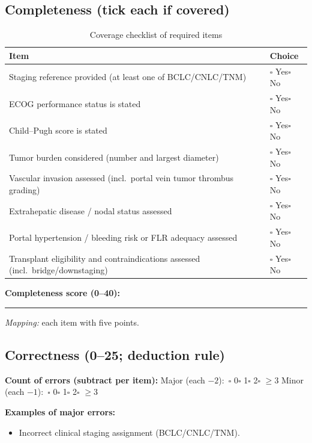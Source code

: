 \documentclass{article}
\begin{document}
\begin{appendices}
\subsection{Completeness (tick each if covered)}
\addtocounter{table}{-1}
\begin{table}[h]
\centering
\caption{Coverage checklist of required items}
\begin{tabular}{p{10.0cm} p{3.0cm}}
\toprule
Item & Choice \\
\midrule
Staging reference provided (at least one of BCLC/CNLC/TNM) & $\square$ Yes\quad $\square$ No \\
ECOG performance status is stated & $\square$ Yes\quad $\square$ No \\
Child--Pugh score is stated & $\square$ Yes\quad $\square$ No \\
Tumor burden considered (number and largest diameter) & $\square$ Yes\quad $\square$ No \\
Vascular invasion assessed (incl.\ portal vein tumor thrombus grading) & $\square$ Yes\quad $\square$ No \\
Extrahepatic disease / nodal status assessed & $\square$ Yes\quad $\square$ No \\
Portal hypertension / bleeding risk or FLR adequacy assessed & $\square$ Yes\quad $\square$ No \\
Transplant eligibility and contraindications assessed (incl.\ bridge/downstaging) & $\square$ Yes\quad $\square$ No \\
\bottomrule
\end{tabular}
\label{tab:completeness}
\end{table}

\noindent \textbf{Completeness score (0--40):}\ \rule{1.6cm}{0.4pt}\quad
\emph{Mapping:} each item with five points.

\subsection{Correctness (0--25; deduction rule)}

\noindent \textbf{Count of errors (subtract per item):}\quad
Major (each $-2$):\ $\square$ 0\quad $\square$ 1\quad $\square$ 2\quad $\square$ $\ge$3\qquad
Minor (each $-1$):\ $\square$ 0\quad $\square$ 1\quad $\square$ 2\quad $\square$ $\ge$3

\medskip
\noindent \textbf{Examples of major errors:}
\begin{itemize}\setlength\itemsep{2pt}
  \item Incorrect clinical staging assignment (BCLC/CNLC/TNM).
\end{itemize}


\end{appendices}
\end{document}
